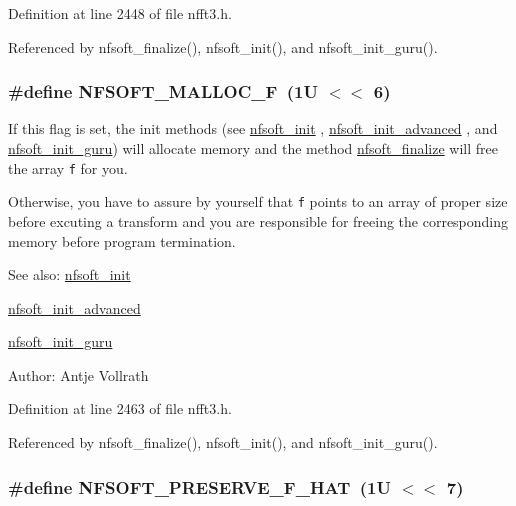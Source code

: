 Definition at line 2448 of file nfft3.h.

Referenced by nfsoft\_\-finalize(), nfsoft\_\-init(), and nfsoft\_\-init\_\-guru().\hypertarget{group__nfsoft_gc65bdc42b4c11296197dc991bbebbd12}{
\subsubsection{\setlength{\rightskip}{0pt plus 5cm}\#define NFSOFT\_\-MALLOC\_\-F~(1U $<$$<$ 6)}}
\label{group__nfsoft_gc65bdc42b4c11296197dc991bbebbd12}


If this flag is set, the init methods (see \hyperlink{group__nfsoft_g31c884458165fa204073c6c16c10775e}{nfsoft\_\-init} , \hyperlink{group__nfsoft_gf4aec4ee2a2a5d56ca27c4f1a7f90b18}{nfsoft\_\-init\_\-advanced} , and \hyperlink{group__nfsoft_g1c13cdd3f82f48fa41acdd313cdc2052}{nfsoft\_\-init\_\-guru}) will allocate memory and the method \hyperlink{group__nfsoft_g30b5c6ae1ff496680f11ddcaad2d5a47}{nfsoft\_\-finalize} will free the array {\tt f} for you. 

Otherwise, you have to assure by yourself that {\tt f} points to an array of proper size before excuting a transform and you are responsible for freeing the corresponding memory before program termination.

\begin{Desc}
\item[See also:]\hyperlink{group__nfsoft_g31c884458165fa204073c6c16c10775e}{nfsoft\_\-init} 

\hyperlink{group__nfsoft_gf4aec4ee2a2a5d56ca27c4f1a7f90b18}{nfsoft\_\-init\_\-advanced} 

\hyperlink{group__nfsoft_g1c13cdd3f82f48fa41acdd313cdc2052}{nfsoft\_\-init\_\-guru} \end{Desc}
\begin{Desc}
\item[Author:]Antje Vollrath \end{Desc}


Definition at line 2463 of file nfft3.h.

Referenced by nfsoft\_\-finalize(), nfsoft\_\-init(), and nfsoft\_\-init\_\-guru().\hypertarget{group__nfsoft_g83119b0d4e62f7cd83e0f74c5ef08dec}{
\subsubsection{\setlength{\rightskip}{0pt plus 5cm}\#define NFSOFT\_\-PRESERVE\_\-F\_\-HAT~(1U $<$$<$ 7)}}
\label{group__nfsoft_g83119b0d4e62f7cd83e0f74c5ef08dec}


